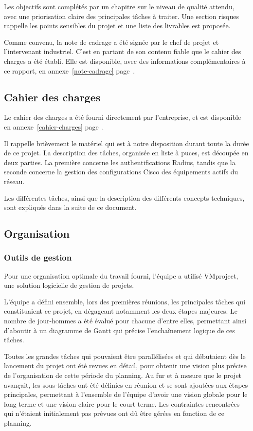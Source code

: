 Les objectifs sont complétés par un chapitre sur le niveau de qualité attendu, avec une priorisation claire des principales tâches à traiter. Une section risques rappelle les points sensibles du projet et une liste des livrables est proposée.

Comme convenu, la note de cadrage a été signée par le chef de projet et l'intervenant industriel. C'est en partant de son contenu fiable que le cahier des charges a été établi. Elle est disponible, avec des informations complémentaires à ce rapport, en annexe~\ref{note-cadrage} page~\pageref{note-cadrage}.

\subsection{Cahier des charges}

Le cahier des charges a été fourni directement par l'entreprise, et est disponible en annexe~\ref{cahier-charges} page~\pageref{cahier-charges}.

Il rappelle brièvement le matériel qui est à notre disposition durant toute la durée de ce projet. La description des tâches, organisée en liste à puces, est découpée en deux parties. La première concerne les authentifications Radius, tandis que la seconde concerne la gestion des configurations Cisco des équipements actifs du réseau.

Les différentes tâches, ainsi que la description des différents concepts techniques, sont expliqués dans la suite de ce document.

\subsection{Organisation}
\subsubsection{Outils de gestion}

Pour une organisation optimale du travail fourni, l'équipe a utilisé VMproject, une solution logicielle de gestion de projets.

L'équipe a défini ensemble, lors des premières réunions, les principales tâches qui constituaient ce projet, en dégageant notamment les deux étapes majeures. Le nombre de jour-hommes a été évalué pour chacune d'entre elles, permettant ainsi d'aboutir à un diagramme de Gantt qui précise l'enchaînement logique de ces tâches.

Toutes les grandes tâches qui pouvaient être parallélisées et qui débutaient dès le lancement du projet ont été revues en détail, pour obtenir une vision plus précise de l'organisation de cette période du planning. Au fur et à mesure que le projet avançait, les sous-tâches ont été définies en réunion et se sont ajoutées aux étapes principales, permettant à l'ensemble de l'équipe d'avoir une vision globale pour le long terme et une vision claire pour le court terme. Les contraintes rencontrées qui n'étaient initialement pas prévues ont dû être gérées en fonction de ce planning.

